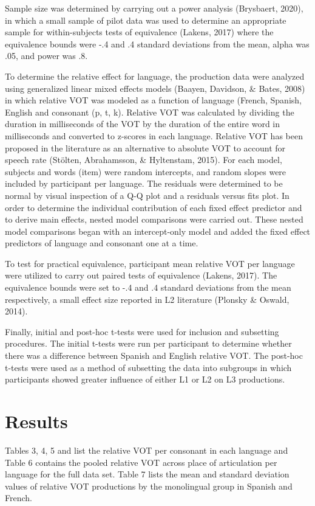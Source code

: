 \documentclass[
  english,
  man]{apa6}
\begin{document}
Sample size was determined by carrying out a power analysis (Brysbaert, 2020), in which a small sample of pilot data was used to determine an appropriate sample for within-subjects tests of equivalence (Lakens, 2017) where the equivalence bounds were -.4 and .4 standard deviations from the mean, alpha was .05, and power was .8.

To determine the relative effect for language, the production data were analyzed using generalized linear mixed effects models (Baayen, Davidson, \& Bates, 2008) in which relative VOT was modeled as a function of language (French, Spanish, English and consonant (p, t, k).
Relative VOT was calculated by dividing the duration in milliseconds of the VOT by the duration of the entire word in milliseconds and converted to z-scores in each language.
Relative VOT has been proposed in the literature as an alternative to absolute VOT to account for speech rate (Stölten, Abrahamsson, \& Hyltenstam, 2015).
For each model, subjects and words (item) were random intercepts, and random slopes were included by participant per language.
The residuals were determined to be normal by visual inspection of a Q-Q plot and a residuals versus fits plot.
In order to determine the individual contribution of each fixed effect predictor and to derive main effects, nested model comparisons were carried out.
These nested model comparisons began with an intercept-only model and added the fixed effect predictors of language and consonant one at a time.

To test for practical equivalence, participant mean relative VOT per language were utilized to carry out paired tests of equivalence (Lakens, 2017).
The equivalence bounds were set to -.4 and .4 standard deviations from the mean respectively, a small effect size reported in L2 literature (Plonsky \& Oswald, 2014).

Finally, initial and post-hoc t-tests were used for inclusion and subsetting procedures.
The initial t-tests were run per participant to determine whether there was a difference between Spanish and English relative VOT.
The post-hoc t-tests were used as a method of subsetting the data into subgroups in which participants showed greater influence of either L1 or L2 on L3 productions.

\hypertarget{results}{%
\section{Results}\label{results}}

Tables 3, 4, 5 and list the relative VOT per consonant in each language and Table 6 contains the pooled relative VOT across place of articulation per language for the full data set.
Table 7 lists the mean and standard deviation values of relative VOT productions by the monolingual group in Spanish and French.
\end{document}

